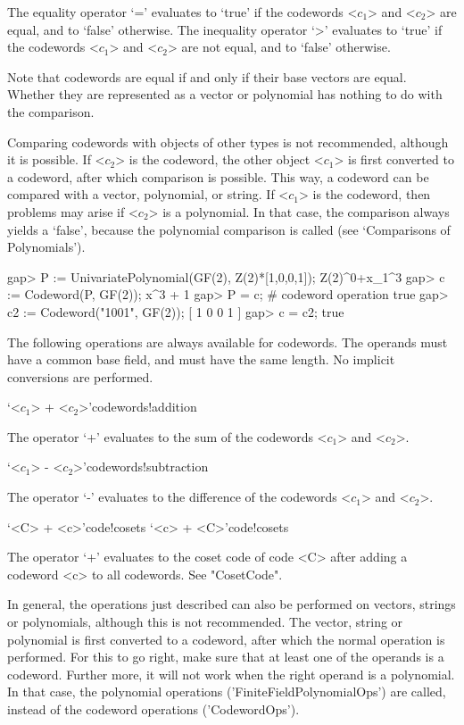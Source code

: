 The equality operator  `=' evaluates to  `true' if the  codewords <$c_1$>
and <$c_2$> are equal, and to  `false' otherwise. The inequality operator
`\<>'  evaluates to `true' if  the codewords <$c_1$>  and <$c_2$> are not
equal, and to `false' otherwise.

Note  that codewords are  equal if  and only  if  their base  vectors are
equal.   Whether they  are  represented  as a vector  or  polynomial  has
nothing to do with the comparison.

Comparing codewords with objects    of other types is  not   recommended,
although it is  possible. If <$c_2$> is  the  codeword, the  other object
<$c_1$>  is first  converted to a   codeword, after  which  comparison is
possible. This way, a codeword can be compared with a vector, polynomial,
or string. If <$c_1$> is the codeword, then problems may arise if <$c_2$>
is a polynomial.  In that case, the comparison  always yields  a `false',
because the  polynomial  comparison    is called (see    `Comparisons  of
Polynomials').

\beginexample
gap> P := UnivariatePolynomial(GF(2), Z(2)*[1,0,0,1]);
Z(2)^0+x_1^3
gap> c := Codeword(P, GF(2));
x^3 + 1
gap> P = c;        # codeword operation
true
gap> c2 := Codeword("1001", GF(2));
[ 1 0 0 1 ]
gap> c = c2;
true 
\endexample


The following operations are always available for codewords. The operands
must have a common base field, and must have the same length. No implicit
conversions are performed.

\>`<$c_1$> + <$c_2$>'{codewords!addition}

The operator  `+'  evaluates  to the   sum of the  codewords <$c_1$>  and
<$c_2$>.

\>`<$c_1$> - <$c_2$>'{codewords!subtraction}

The operator `-' evaluates to the difference of the codewords <$c_1$> and
<$c_2$>.

\>`<C> + <c>'{code!cosets}
\>`<c> + <C>'{code!cosets}

The operator `+' evaluates to the  coset code of  code <C> after adding a
codeword <c> to all codewords. See "CosetCode".

In general, the    operations just described  can also    be performed on
vectors,  strings or polynomials,  although this is  not recommended. The
vector, string  or  polynomial is  first converted  to  a codeword, after
which the normal operation is performed. For this to  go right, make sure
that at  least one of  the operands is a  codeword. Further more, it will
not  work when  the  right operand  is  a  polynomial. In that  case, the
polynomial operations ('FiniteFieldPolynomialOps') are called, instead of
the codeword operations ('CodewordOps').

